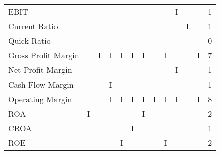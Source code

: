 \documentclass[12pt,a4paper,english]{article}
\begin{document}
\begin{table}[H]
\begin{minipage}{\textwidth}
{\begin{tabular}{@{}lrrrrrrrrrrr|r@{}}
				EBIT                                           &                                   &                               &                                 &                                    &   &   &   &   & I &   &   & 1 \\
				Current Ratio                                  &                                   &                               &                                 &                                    &   &   &   &   &   & I &   & 1 \\
				Quick Ratio                                    &                                   &                               &                                 &                                    &   &   &   &   &   &   &   & 0 \\
				Gross Profit Margin                            &                                   & I                             & I                               & I                                  & I & I &   & I &   &   & I & 7 \\
				Net Profit Margin                              &                                   &                               &                                 &                                    &   &   &   &   & I &   &   & 1 \\
				Cash Flow Margin                               &                                   &                               & I                               &                                    &   &   &   &   &   &   &   & 1 \\
				Operating Margin                               &                                   &                               & I                               & I                                  & I & I & I & I & I &   & I & 8 \\
				ROA                                            & I                                 &                               &                                 &                                    &   & I &   &   &   &   &   & 2 \\
				CROA                                           &                                   &                               &                                 &                                    & I &   &   &   &   &   &   & 1 \\
				ROE                                            &                                   &                               &                                 & I                                  &   &   &   & I &   &   &   & 2 \\

\end{tabular}}
\end{minipage}
\end{table}
\end{document}
